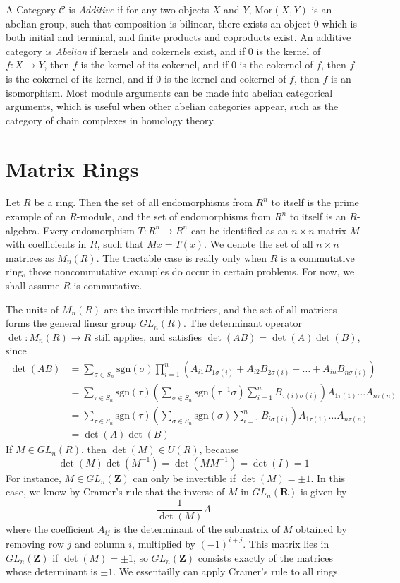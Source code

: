 A Category $\mathcal{C}$ is \emph{Additive} if for any two objects $X$ and $Y$, $\text{Mor}(X,Y)$ is an abelian group, such that composition is bilinear, there exists an object $0$ which is both initial and terminal, and finite products and coproducts exist. An additive category is \emph{Abelian} if kernels and cokernels exist, and if $0$ is the kernel of $f: X \to Y$, then $f$ is the kernel of its cokernel, and if $0$ is the cokernel of $f$, then $f$ is the cokernel of its kernel, and if $0$ is the kernel and cokernel of $f$, then $f$ is an isomorphism. Most module arguments can be made into abelian categorical arguments, which is useful when other abelian categories appear, such as the category of chain complexes in homology theory.

\section{Matrix Rings}

Let $R$ be a ring. Then the set of all endomorphisms from $R^n$ to itself is the prime example of an $R$-module, and the set of endomorphisms from $R^n$ to itself is an $R$-algebra. Every endomorphism $T:R^n \to R^n$ can be identified as an $n \times n$ matrix $M$ with coefficients in $R$, such that $Mx = T(x)$. We denote the set of all $n \times n$ matrices as $M_n(R)$. The tractable case is really only when $R$ is a commutative ring, those noncommutative examples do occur in certain problems. For now, we shall assume $R$ is commutative.

The units of $M_n(R)$ are the invertible matrices, and the set of all matrices forms the general linear group $GL_n(R)$. The determinant operator $\det: M_n(R) \to R$ still applies, and satisfies $\det(AB) = \det(A) \det(B)$, since
%
\begin{align*}
    \det(AB) &= \sum_{\sigma \in S_n} \text{sgn}(\sigma) \prod_{i = 1}^n (A_{i1} B_{1\sigma(i)} + A_{i2} B_{2 \sigma(i)} + \dots + A_{in} B_{n \sigma(i)})\\
    &= \sum_{\tau \in S_n} \text{sgn}(\tau) \left( \sum_{\sigma \in S_n} \text{sgn}(\tau^{-1} \sigma) \sum_{i = 1}^n B_{\tau(i) \sigma(i)} \right) A_{1\tau(1)} \dots A_{n \tau(n)}\\
    &= \sum_{\tau \in S_n} \text{sgn}(\tau) \left( \sum_{\sigma \in S_n} \text{sgn}(\sigma) \sum_{i = 1}^n B_{i \sigma(i)} \right) A_{1\tau(1)} \dots A_{n \tau(n)}\\
    &= \det(A) \det(B)
\end{align*}
%
If $M \in GL_n(R)$, then $\det(M) \in U(R)$, because
%
\[ \det(M) \det(M^{-1}) = \det(MM^{-1}) = \det(I) = 1 \]
%
For instance, $M \in GL_n(\mathbf{Z})$ can only be invertible if $\det(M) = \pm 1$. In this case, we know by Cramer's rule that the inverse of $M$ in $GL_n(\mathbf{R})$ is given by
%
\[ \frac{1}{\det(M)} A \]
%
where the coefficient $A_{ij}$ is the determinant of the submatrix of $M$ obtained by removing row $j$ and column $i$, multiplied by $(-1)^{i+j}$. This matrix lies in $GL_n(\mathbf{Z})$ if $\det(M) = \pm 1$, so $GL_n(\mathbf{Z})$ consists exactly of the matrices whose determinant is $\pm 1$. We essentailly can apply Cramer's rule to all rings.

